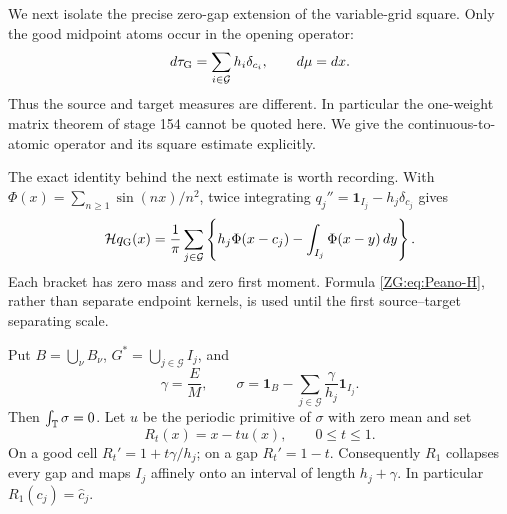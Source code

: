 We next isolate the precise zero-gap extension of the variable-grid
square.  Only the good midpoint atoms occur in the opening operator:
\begin{equation}\label{ZG:eq:tau}
 d\tau_{\rm G}=\sum_{i\in\mathcal G}h_i\delta_{c_i},
 \qquad d\mu=dx.
\end{equation}
Thus the source and target measures are different.  In particular the
one-weight matrix theorem of stage 154 cannot be quoted here.  We give
the continuous-to-atomic operator and its square estimate explicitly.

The exact identity behind the next estimate is worth recording.  With
$\Phi(x)=\sum_{n\ge1}\sin(nx)/n^2$, twice integrating
$q_j''=\mathbf1_{I_j}-h_j\delta_{c_j}$ gives
\begin{equation}\label{ZG:eq:Peano-H}
 \mathcal H q_{\rm G}(x)=\frac1\pi\sum_{j\in\mathcal G}
 \left\{h_j\Phi(x-c_j)-\int_{I_j}\Phi(x-y)\,dy\right\}.
\end{equation}
Each bracket has zero mass and zero first moment.  Formula
\eqref{ZG:eq:Peano-H}, rather than separate endpoint kernels, is used until
the first source--target separating scale.

Put $B=\bigcup_\nu B_\nu$, $G^*=\bigcup_{j\in\mathcal G}I_j$, and
\begin{equation}\label{ZG:eq:sigma}
 \gamma=\frac EM,
 \qquad
 \sigma=\mathbf1_B-
 \sum_{j\in\mathcal G}\frac{\gamma}{h_j}\mathbf1_{I_j}.
\end{equation}
Then $\int_\mathbb T\sigma=0$.  Let $u$ be the periodic primitive of $\sigma$
with zero mean and set
\begin{equation}\label{ZG:eq:collapse-map}
 R_t(x)=x-tu(x),\qquad 0\le t\le1.
\end{equation}
On a good cell $R_t'=1+t\gamma/h_j$; on a gap $R_t'=1-t$.
Consequently $R_1$ collapses every gap and maps $I_j$ affinely onto an
interval of length $h_j+\gamma$.  In particular
$R_1(c_j)=\widehat c_j$.

